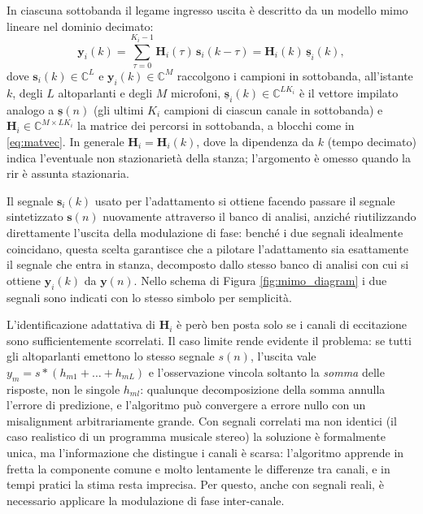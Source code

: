 \documentclass[11pt,a4paper]{article}
\begin{document}
	In ciascuna sottobanda il legame ingresso uscita è descritto da un modello \ac{mimo} lineare nel dominio decimato:
	\begin{equation}
		\mathbf{y}_i(k) = \sum_{\tau=0}^{K_i-1} \mathbf{H}_i(\tau)\,\mathbf{s}_i(k-\tau)
		= \mathbf{H}_i(k)\,\underline{\mathbf{s}}_i(k),
		\label{eq:subband_model}
	\end{equation}
	dove $\mathbf{s}_i(k)\in\mathbb{C}^{L}$ e $\mathbf{y}_i(k)\in\mathbb{C}^{M}$ raccolgono i campioni in sottobanda, all'istante $k$, degli $L$ altoparlanti e degli $M$ microfoni, $\underline{\mathbf{s}}_i(k)\in\mathbb{C}^{LK_i}$ è il vettore impilato analogo a $\underline{\mathbf{s}}(n)$ (gli ultimi $K_i$ campioni di ciascun canale in sottobanda) e $\mathbf{H}_i\in\mathbb{C}^{M\times LK_i}$ la matrice dei percorsi in sottobanda, a blocchi come in \eqref{eq:matvec}. In generale $\mathbf{H}_i = \mathbf{H}_i(k)$, dove la dipendenza da $k$ (tempo decimato) indica l'eventuale non stazionarietà della stanza; l'argomento è omesso quando la \ac{rir} è assunta stazionaria.
	
	Il segnale $\mathbf{s}_i(k)$ usato per l'adattamento si ottiene facendo passare il segnale sintetizzato $\mathbf{s}(n)$ nuovamente attraverso il banco di analisi, anziché riutilizzando direttamente l'uscita della modulazione di fase: benché i due segnali idealmente coincidano, questa scelta garantisce che a pilotare l'adattamento sia esattamente il segnale che entra in stanza, decomposto dallo stesso banco di analisi con cui si ottiene $\mathbf{y}_i(k)$ da $\mathbf{y}(n)$. Nello schema di Figura \ref{fig:mimo_diagram} i due segnali sono indicati con lo stesso simbolo per semplicità.
	
	L'identificazione adattativa di $\mathbf{H}_i$ è però ben posta solo se i canali di eccitazione sono sufficientemente scorrelati.
	Il caso limite rende evidente il problema: se tutti gli altoparlanti emettono lo stesso segnale $s(n)$, l'uscita vale $y_m = s*(h_{m1}+\dots+h_{mL})$ e l'osservazione vincola soltanto la \emph{somma} delle risposte, non le singole $h_{ml}$: qualunque decomposizione della somma annulla l'errore di predizione, e l'algoritmo può convergere a errore nullo con un misalignment arbitrariamente grande.
	Con segnali correlati ma non identici (il caso realistico di un programma musicale stereo) la soluzione è formalmente unica, ma l'informazione che distingue i canali è scarsa: l'algoritmo apprende in fretta la componente comune e molto lentamente le differenze tra canali, e in tempi pratici la stima resta imprecisa.
	Per questo, anche con segnali reali, è necessario applicare la modulazione di fase inter-canale.
	
\end{document}
